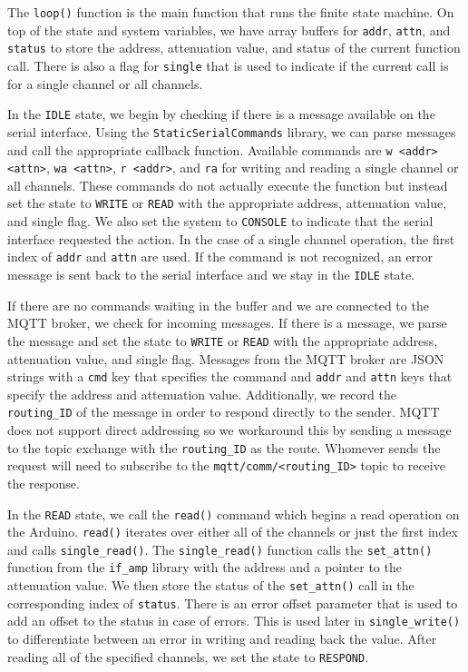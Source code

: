 The \texttt{loop()} function is the main function that runs the finite state machine.
On top of the state and system variables, we have array buffers for \texttt{addr}, \texttt{attn}, and \texttt{status} to store the address, attenuation value, and status of the current function call. 
There is also a flag for \texttt{single} that is used to indicate if the current call is for a single channel or all channels.

In the \texttt{IDLE} state, we begin by checking if there is a message available on the serial interface. 
Using the \texttt{StaticSerialCommands} library, we can parse messages and call the appropriate callback function. 
Available commands are \texttt{w <addr> <attn>}, \texttt{wa <attn>}, \texttt{r <addr>}, and \texttt{ra} for writing and reading a single channel or all channels.
These commands do not actually execute the function but instead set the state to \texttt{WRITE} or \texttt{READ} with the appropriate address, attenuation value, and single flag.
We also set the system to \texttt{CONSOLE} to indicate that the serial interface requested the action.
In the case of a single channel operation, the first index of \texttt{addr} and \texttt{attn} are used. 
If the command is not recognized, an error message is sent back to the serial interface and we stay in the \texttt{IDLE} state.

If there are no commands waiting in the buffer and we are connected to the MQTT broker, we check for incoming messages.
If there is a message, we parse the message and set the state to \texttt{WRITE} or \texttt{READ} with the appropriate address, attenuation value, and single flag.
Messages from the MQTT broker are JSON strings with a \texttt{cmd} key that specifies the command and \texttt{addr} and \texttt{attn} keys that specify the address and attenuation value.
Additionally, we record the \texttt{routing\_ID} of the message in order to respond directly to the sender.
MQTT does not support direct addressing so we workaround this by sending a message to the topic exchange with the \texttt{routing\_ID} as the route. 
Whomever sends the request will need to subscribe to the \texttt{mqtt/comm/<routing\_ID>} topic to receive the response.

In the \texttt{READ} state, we call the \texttt{read()} command which begins a read operation on the Arduino. 
\texttt{read()} iterates over either all of the channels or just the first index and calls \texttt{single\_read()}.
The \texttt{single\_read()} function calls the \texttt{set\_attn()} function from the \texttt{if\_amp} library with the address and a pointer to the attenuation value.
We then store the status of the \texttt{set\_attn()} call in the corresponding index of \texttt{status}.
There is an error offset parameter that is used to add an offset to the status in case of errors.
This is used later in \texttt{single\_write()} to differentiate between an error in writing and reading back the value. 
After reading all of the specified channels, we set the state to \texttt{RESPOND}.

